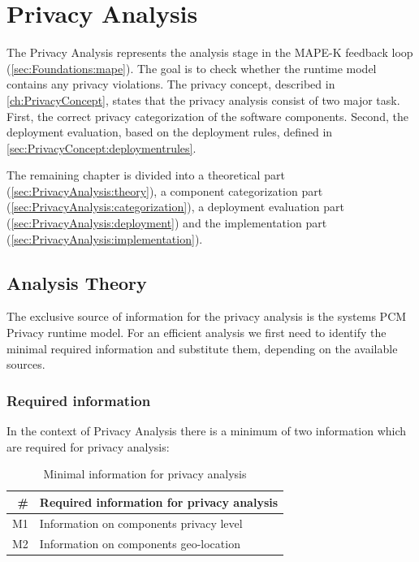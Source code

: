 \chapter{Privacy Analysis}
\label{ch:PrivacyAnalysis}

The Privacy Analysis represents the analysis stage in the MAPE-K feedback loop (\autoref{sec:Foundations:mape}). The goal is to check whether the runtime model contains any privacy violations. The privacy concept, described in \autoref{ch:PrivacyConcept}, states that the privacy analysis consist of two major task. First, the correct privacy categorization of the software components. Second, the deployment evaluation, based on the deployment rules, defined in \autoref{sec:PrivacyConcept:deploymentrules}.

The remaining chapter is divided into a theoretical part (\autoref{sec:PrivacyAnalysis:theory}), a component categorization part (\autoref{sec:PrivacyAnalysis:categorization}), a deployment evaluation part (\autoref{sec:PrivacyAnalysis:deployment}) and the implementation part (\autoref{sec:PrivacyAnalysis:implementation}).


\section{Analysis Theory}
\label{sec:PrivacyAnalysis:theory}

The exclusive source of information for the privacy analysis is the systems PCM Privacy runtime model. For an efficient analysis we first need to identify the minimal required information and substitute them, depending on the available sources.


\subsection{Required information}
In the context of Privacy Analysis there is a minimum of two information which are required for privacy analysis:

\begin{table}[h]
	\centering
	\begin{tabular}{r | l}
		\hline
		\textbf{\#} & \textbf{Required information for privacy analysis}\\
		\hline
		M1 & Information on components privacy level \\
		M2 & Information on components geo-location \\
		\hline
	\end{tabular}
	\caption{Minimal information for privacy analysis}
	\label{tab:pa_minimal_info}
\end{table}

